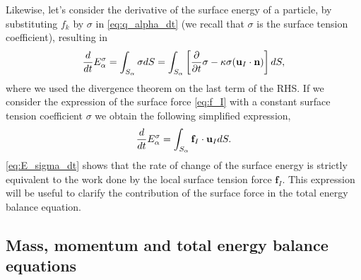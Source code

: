 Likewise, let's consider the derivative of the surface energy of a particle, by substituting $f_k$ by $\sigma$ in \ref{eq:q_alpha_dt} (we recall that $\sigma$ is the surface tension coefficient), resulting in 
\begin{equation*}
    \frac{d}{d t}  E^\sigma_\alpha
    = \int_{S_\alpha} \sigma dS 
    = \int_{S_\alpha} \left[
    \frac{\partial}{\partial t} \sigma
    - \kappa \sigma (\textbf{u}_I \cdot \textbf{n})
    \right]dS,
\end{equation*}
where we used the divergence theorem on the last term of the RHS. 
If we consider the expression of the surface force \ref{eq:f_I} with a constant surface tension coefficient $\sigma$ we obtain the following simplified expression,
\begin{equation}
    \frac{d}{d t}  E^\sigma_\alpha
    = \int_{S_\alpha} 
    \textbf{f}_I \cdot \textbf{u}_I
    dS.
    \label{eq:E_sigma_dt}
\end{equation}
\ref{eq:E_sigma_dt} shows that the rate of change of the surface energy is strictly equivalent to the work done by the local surface tension force $\textbf{f}_I$. 
This expression will be useful to clarify the contribution of the surface force in the total energy balance equation. 

\subsection{Mass, momentum and total energy balance equations}

